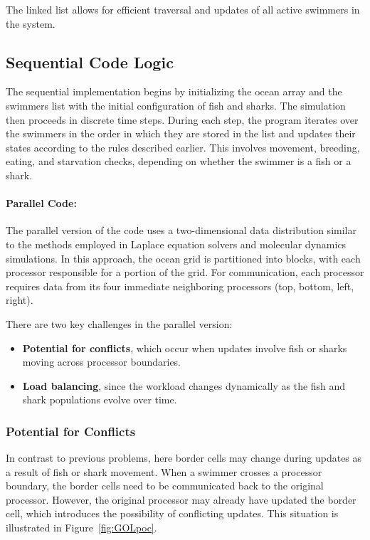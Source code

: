 \documentclass[12pt]{book}
\begin{document}
The linked list allows for efficient traversal and updates of all active swimmers in the system.

\subsection*{Sequential Code Logic}
The sequential implementation begins by initializing the ocean array and the swimmers list with the initial configuration of fish and sharks. The simulation then proceeds in discrete time steps. During each step, the program iterates over the swimmers in the order in which they are stored in the list and updates their states according to the rules described earlier. This involves movement, breeding, eating, and starvation checks, depending on whether the swimmer is a fish or a shark.

\paragraph{Parallel Code:}
The parallel version of the code uses a two-dimensional data distribution similar to the methods employed in Laplace equation solvers and molecular dynamics simulations. In this approach, the ocean grid is partitioned into blocks, with each processor responsible for a portion of the grid. For communication, each processor requires data from its four immediate neighboring processors (top, bottom, left, right). 

There are two key challenges in the parallel version:
\begin{itemize}
    \item \textbf{Potential for conflicts}, which occur when updates involve fish or sharks moving across processor boundaries.
    \item \textbf{Load balancing}, since the workload changes dynamically as the fish and shark populations evolve over time.
\end{itemize}

\subsubsection*{Potential for Conflicts}
In contrast to previous problems, here border cells may change during updates as a result of fish or shark movement. When a swimmer crosses a processor boundary, the border cells need to be communicated back to the original processor. However, the original processor may already have updated the border cell, which introduces the possibility of conflicting updates. This situation is illustrated in Figure~\ref{fig:GOLpoc}.
\end{document}
